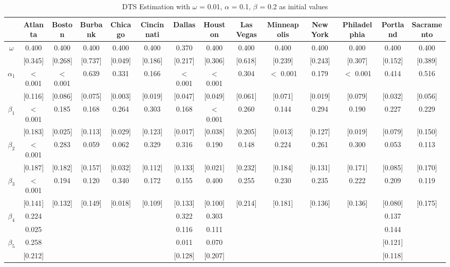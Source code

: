 \documentclass{article}
\begin{document}
	
	
	\begin{sidewaystable}[htbp]
		\centering
		\caption{DTS Estimation with $\omega$ = 0.01, $\alpha$ = 0.1, $\beta$ = 0.2 as initial values}
		\begin{tabular}{cccccccccccccc}
			\toprule
			& Atlanta & Boston & Burbank & Chicago & Cincinnati & Dallas & Houston & Las Vegas & Minneapolis & New York & Philadelphia & Portland & Sacramento \\
			\midrule
			$\omega$ & 0.400 & 0.400 & 0.400 & 0.400 & 0.400 & 0.370 & 0.400 & 0.400 & 0.400 & 0.400 & 0.400 & 0.400 & 0.400\\
			& [0.345] & [0.268] & [0.737] & [0.049] & [0.186] & [0.217] & [0.306] & [0.618] & [0.239] & [0.243] & [0.307] & [0.152] & [0.389] \\
			$\alpha_{1}$  & $<$0.001  & $<$0.001  & 0.639 & 0.331 & 0.166 & $<$ 0.001  & $<$ 0.001  & 0.304 & $<$ 0.001  & 0.179 & $<$ 0.001  & 0.414 & 0.516 \\
			& [0.116] & [0.086] & [0.075] & [0.003] & [0.019] & [0.047] & [0.049] & [0.061] & [0.071] & [0.019] & [0.079] & [0.032] & [0.056] \\
			$\beta_{1}$   & $<$ 0.001  & 0.185 & 0.168 & 0.264 & 0.303 & 0.168 & $<$ 0.001  & 0.260 & 0.144 & 0.294 & 0.190 & 0.227 & 0.229 \\
			& [0.183] & [0.025] & [0.113] & [0.029] & [0.123] & [0.017] & [0.038] & [0.205] & [0.013] & [0.127] & [0.019] & [0.079] & [0.150] \\
			$\beta_{2}$   & $<$ 0.001  & 0.283 & 0.059 & 0.062 & 0.329 & 0.316 & 0.190 & 0.148 & 0.224 & 0.261 & 0.300 & 0.053 & 0.113 \\
			& [0.187] & [0.182] & [0.157] & [0.032] & [0.112] & [0.133] & [0.021] & [0.232] & [0.184] & [0.131] & [0.171] & [0.085] & [0.170] \\
			$\beta_{3}$   & $<$ 0.001 & 0.194 & 0.120 & 0.340 & 0.172 & 0.155 & 0.400 & 0.255 & 0.230 & 0.235 & 0.222 & 0.209 & 0.119 \\
			& [0.141] & [0.132] & [0.149] & [0.018] & [0.109] & [0.133] & [0.100] & [0.214] & [0.181] & [0.136] & [0.136] & [0.080] & [0.175] \\
			$\beta_{4}$   & 0.224 & & & & & 0.322 & 0.303 & & & & & 0.137 & \\
			& 0.025 & & & & & 0.116 & 0.111 & & & & & 0.144 & \\
			$\beta_{5}$   & 0.258 & & & & & 0.011 & 0.070 & & & & & [0.121] & \\
			& [0.212] & & & & & [0.128] & [0.207] & & & & & [0.118] & \\
			\bottomrule
		\end{tabular}
	\end{sidewaystable}
	
\end{document}

